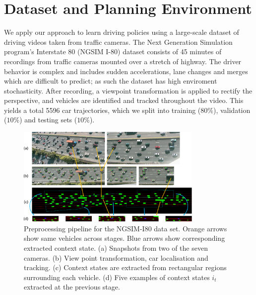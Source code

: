 \documentclass{article} %
\begin{document}
\section{Dataset and Planning Environment}
\label{dataset-and-planning}

We apply our approach to learn driving policies using a large-scale dataset of driving videos taken from traffic cameras.
The Next Generation Simulation program's Interstate 80 (NGSIM I-80) dataset \citep{NGSIM} consists of 45 minutes of recordings from traffic cameras mounted over a stretch of highway.
The driver behavior is complex and includes sudden accelerations, lane changes and merges which are difficult to predict; as such the dataset has high enviroment stochasticity.
After recording, a viewpoint transformation is applied to rectify the perspective, and vehicles are identified and tracked throughout the video.
This yields a total 5596 car trajectories, which we split into training ($80\%$), validation ($10\%$) and testing sets ($10\%$).

\begin{figure}[t]
  \centering
  \includegraphics[width=0.8\textwidth]{figures/driving/I-80-blue-crop.pdf}
  \caption{
    Preprocessing pipeline for the NGSIM-I80 data set.
    Orange arrows show same vehicles across stages.
    Blue arrows show corresponding extracted context state.
    (a) Snapshots from two of the seven cameras.
    (b) View point transformation, car localisation and tracking.
    (c) Context states are extracted from rectangular regions surrounding each vehicle.
    (d) Five examples of context states $i_t$ extracted at the previous stage.
  }
\label{I-80}
\end{figure}
\end{document}
